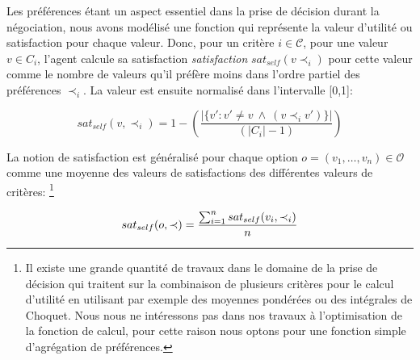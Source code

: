 		Les préférences étant un aspect essentiel dans la prise de décision durant la négociation, nous avons modélisé une fonction qui représente la valeur d'utilité ou satisfaction pour chaque valeur. Donc, pour un critère $i\in \mathcal{C}$, pour une valeur $v\in C_i$, l'agent calcule sa satisfaction \emph{satisfaction} $sat_{self}(v \prec_i)$ pour cette valeur comme le nombre de valeurs qu'il préfère moins dans l'ordre partiel des préférences $\prec_i$. La valeur est ensuite normalisé dans l'intervalle [0,1]:
		
		\begin{equation}
		sat_{self}(v, \prec_i) =	1 - \left( \frac{|\{v' : v' \neq v \  \wedge \ (v \prec_i v')\}| }{( |C_i| - 1 )}\right)
		\end{equation}
		
		La notion de satisfaction est généralisé pour chaque option $o= (v_1, \ldots, v_n)\in \mathcal{O}$ comme une moyenne des valeurs de satisfactions des différentes valeurs de critères: 
		\footnote{Il existe une grande quantité de travaux  dans le domaine de la prise de décision  qui traitent sur la combinaison de plusieurs critères pour le calcul d'utilité en utilisant par exemple des moyennes pondérées ou des intégrales de Choquet. Nous nous ne intéressons pas dans nos travaux à l'optimisation de la fonction de calcul, pour cette raison nous optons pour une fonction simple d'agrégation de préférences.}

		\begin{equation}
		sat_{self}(o, \prec) = \frac{\sum_{i=1}^{n} sat_{self}(v_i, \prec_i) }{n}
		\vspace{-1.5em} 
		\end{equation}
	


